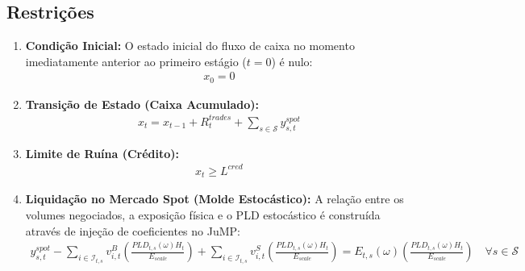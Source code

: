 \documentclass{article}
\begin{document}
\subsection{Restrições}
\begin{enumerate}
    \item \textbf{Condição Inicial:}
    O estado inicial do fluxo de caixa no momento imediatamente anterior ao primeiro estágio ($t=0$) é nulo:
    \begin{align}
        x_0 = 0
    \end{align}
    
    \item \textbf{Transição de Estado (Caixa Acumulado):}
    \begin{align}
        x_t = x_{t-1} + R^{trades}_t + \sum_{s \in \mathcal{S}} y^{spot}_{s,t}
    \end{align}
    
    \item \textbf{Limite de Ruína (Crédito):}
    \begin{align}
        x_t \geq L^{cred}
    \end{align}
    
    \item \textbf{Liquidação no Mercado Spot (Molde Estocástico):}
    A relação entre os volumes negociados, a exposição física e o PLD estocástico é construída através de injeção de coeficientes no JuMP:
    \begin{align}
        y^{spot}_{s,t} - \sum_{i \in \mathcal{I}_{t,s}} v^{B}_{i,t} \left( \frac{PLD_{t,s}(\omega) H_t}{E_{scale}} \right) + \sum_{i \in \mathcal{I}_{t,s}} v^{S}_{i,t} \left( \frac{PLD_{t,s}(\omega) H_t}{E_{scale}} \right) = E_{t,s}(\omega) \left( \frac{PLD_{t,s}(\omega) H_t}{E_{scale}} \right) \quad \forall s \in \mathcal{S}
    \end{align}
\end{enumerate}
\end{document}
